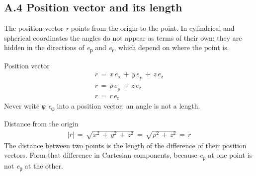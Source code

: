 \documentclass[11pt]{article}
\begin{document}
\begin{keepsection}
\section{A.4 Position vector and its length}

The position vector \textit{r} points from the origin to the point. In cylindrical and spherical coordinates the angles do not appear as terms of their own: they are hidden in the directions of \textit{e}\textsubscript{ρ} and \textit{e}\textsubscript{r}, which depend on where the point is.

\begin{equationcard}{Position vector}
\[ \begin{gathered} {r}\, =\, {x\,e}_{\mathrm{x}}\, +\, {y\,e}_{\mathrm{y}}\, +\, {z\,e}_{\mathrm{z}} \\ {r}\, =\, {ρ\,e}_{ρ}\, +\, {z\,e}_{\mathrm{z}} \\ {r}\, =\, {r\,e}_{\mathrm{r}} \end{gathered} \]
{\small Never write \textit{φ e}\textsubscript{φ} into a position vector: an angle is not a length.}
\end{equationcard}

\begin{equationcard}{Distance from the origin}
\[ \begin{gathered} |{r}|\, =\, \sqrt{{x}^{2}\, +\, {y}^{2}\, +\, {z}^{2}}\, =\, \sqrt{{ρ}^{2}\, +\, {z}^{2}}\, =\, {r} \end{gathered} \]
{\small The distance between two points is the length of the difference of their position vectors. Form that difference in Cartesian components, because \textit{e}\textsubscript{ρ} at one point is not \textit{e}\textsubscript{ρ} at the other.}
\end{equationcard}
\end{keepsection}
\end{document}
